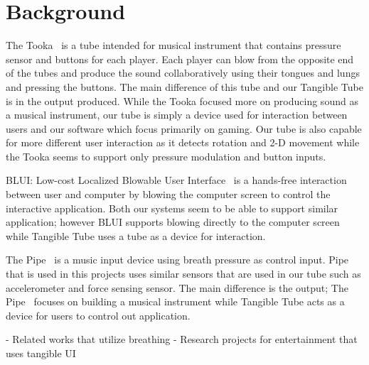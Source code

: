 \section{Background}\label{sec:background}

The Tooka~\cite{tooka} is a tube intended for musical instrument that contains pressure sensor and buttons for each player. Each player can blow from the opposite end of the tubes and produce the sound collaboratively using their tongues and lungs and pressing the buttons. The main difference of this tube and our Tangible Tube is in the output produced. While the Tooka focused more on producing sound as a musical instrument, our tube is simply a device used for interaction between users and our software which focus primarily on gaming. Our tube is also capable for more different user interaction as it detects rotation and 2-D movement while the Tooka seems to support only pressure modulation and button inputs.

BLUI: Low-cost Localized Blowable User Interface~\cite{blui} is a hands-free interaction between user and computer by blowing the computer screen to control the interactive application. Both our systems seem to be able to support similar application; however BLUI supports blowing directly to the computer screen while Tangible Tube uses a tube as a device for interaction.

The Pipe~\cite{thepipe} is a music input device using breath pressure as control input. Pipe that is used in this projects uses similar sensors that are used in our tube such as accelerometer and force sensing sensor. The main difference is the output; The Pipe~\cite{thepipe} focuses on building a musical instrument while Tangible Tube acts as a device for users to control out application.


\TODO
- Related works that utilize breathing \newline
- Research projects for entertainment that uses tangible UI
